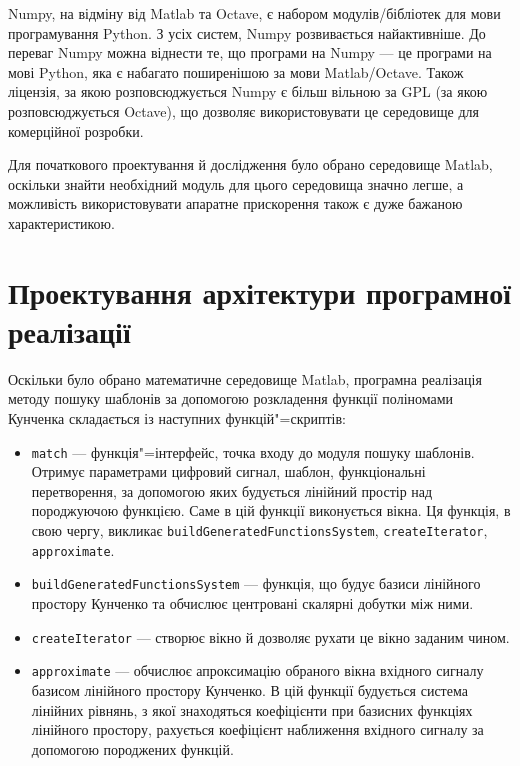     Numpy, на відміну від Matlab та Octave, є набором модулів/бібліотек для мови програмування Python.
    З усіх систем, Numpy розвивається найактивніше.
    До переваг Numpy можна віднести те, що програми на Numpy --- це програми на мові Python, яка є набагато
    поширенішою за мови Matlab/Octave.
    Також ліцензія, за якою розповсюджується Numpy є більш вільною за GPL (за якою розповсюджується Octave), що
    дозволяє використовувати це середовище для комерційної розробки.

    Для початкового проектування й дослідження було обрано середовище Matlab, оскільки знайти необхідний модуль для
    цього середовища значно легше, а можливість використовувати апаратне прискорення також є дуже бажаною
    характеристикою.
\section{Проектування архітектури програмної реалізації}
    Оскільки було обрано математичне середовище Matlab, програмна реалізація методу пошуку шаблонів за допомогою
    розкладення функції поліномами Кунченка складається із наступних функцій"=скриптів:
    \begin{itemize}
        \item \verb'match' --- функція"=інтерфейс, точка входу до модуля пошуку шаблонів.
            Отримує параметрами цифровий сигнал, шаблон, функціональні перетворення, за допомогою яких будується
            лінійний простір над породжуючою функцією.
            Саме в цій функції виконується  вікна.
            Ця функція, в свою чергу, викликає \verb'buildGeneratedFunctionsSystem', \verb'createIterator',
            \verb'approximate'.
        \item \verb'buildGeneratedFunctionsSystem' --- функція, що будує базиси лінійного простору Кунченко та
            обчислює центровані скалярні добутки між ними.
        \item \verb'createIterator' --- створює вікно й дозволяє рухати це вікно заданим чином.
        \item \verb'approximate' --- обчислює апроксимацію обраного вікна вхідного сигналу базисом лінійного простору
            Кунченко.
            В цій функції будується система лінійних рівнянь, з якої знаходяться коефіцієнти при базисних функціях
            лінійного простору, рахується коефіцієнт наближення вхідного сигналу за допомогою породжених функцій.
    \end{itemize}

